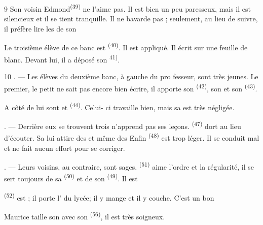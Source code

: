 \begin{VUpage}[11]{9}
\VUblancAlinea
Son voisin Edmond\textsuperscript{(39)} ne l'aime pas. Il est bien un\nl
peu paresseux, mais il est silencieux et il se tient\nl
tranquille. Il ne bavarde pas ; seulement, au lieu de\nl
suivre, il préfère lire les  de son \nl
{}

\VUblancAlinea
Le troisième élève de ce banc est \textsuperscript{(40)}. Il\nl
est appliqué. Il écrit sur une feuille de \nl
blanc. Devant lui, il a déposé son  \textsuperscript{41)}.
\end{VUpage}

\begin{VUpage}[12]{10}
. --- Les élèves du deuxième banc, à gauche du pro\cc
fesseur, sont très jeunes. Le premier, le petit \nl
ne sait pas encore bien écrire, il apporte son \cc
{}\textsuperscript{(42)}, son  et son \textsuperscript{(43)}.

A côté de lui sont  et \textsuperscript{(44)}. Celui-\nl
ci travaille bien, mais sa  est très négligée.

. --- Derrière eux se trouvent trois \nl
{} n'apprend pas ses leçons. \textsuperscript{(47)} dort\nl
au lieu d'écouter. Sa  lui attire des \cc
{} et même des  Enfin \textsuperscript{(48)}\nl
est trop léger. Il se conduit mal et ne fait aucun effort\nl
pour se corriger.

. --- Leurs voisins, au contraire, sont sages.\nl
{} \textsuperscript{(51)} aime l'ordre et la régularité, il se sert\nl
toujours de sa  \textsuperscript{(50)} et de son  \textsuperscript{(49)}. Il est\nl
{}

\VUblancAlinea
{}\textsuperscript{(52)} est ; il porte l' du\nl
lycée; il y mange et il y couche. C'est un bon \cc
{}

\VUblancAlinea
Maurice taille son  avec son \textsuperscript{(56)}, il est\nl
très soigneux.


\end{VUpage}
